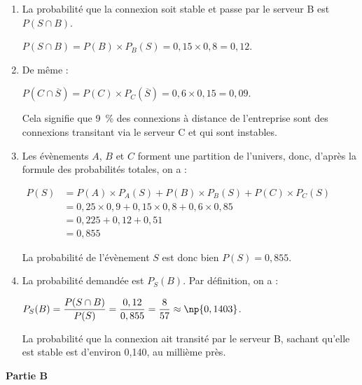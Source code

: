 \begin{enumerate}
-

















\item La probabilité que la connexion soit stable et passe par le serveur B est $P(S \cap B)$.

$P(S \cap B) = P(B) \times P_B(S) = 0,15 \times 0,8 = 0,12$.

\item De même :

$P\left(C \cap \overline{S}\right) = P(C) \times P_C\left(\overline{S}\right) = 0,6 \times 0,15 = 0,09$.

Cela signifie que 9~\% des connexions à distance de l'entreprise sont des connexions transitant via le serveur C et qui sont instables.

\item Les évènements $A$, $B$ et $C$ forment une partition de l'univers, donc, d'après la formule des probabilités totales, on a :

$\begin{aligned}
P(S) &= P(A) \times P_A(S)+ P(B) \times P_B(S) + P(C) \times P_C(S)\\
&= 0,25 \times 0,9 + 0,15 \times 0,8 + 0,6 \times 0,85 \\
&= 0,225 + 0,12 + 0,51\\
&= 0,855
\end{aligned}$

La probabilité de l'évènement $S$ est donc bien $P(S)=0,855$.

\item La probabilité demandée est $P_S(B)$.
Par définition, on a :

$P_S(B) = \dfrac{P(S\cap B)}{P(S)} = \dfrac{0,12}{0,855} = \dfrac{8}{57}\approx \np{0,1403}$.

La probabilité que la connexion ait transité par le serveur B, sachant qu'elle est stable est d'environ 0,140, au millième près.
\end{enumerate}


\textbf{Partie B}

\medskip

